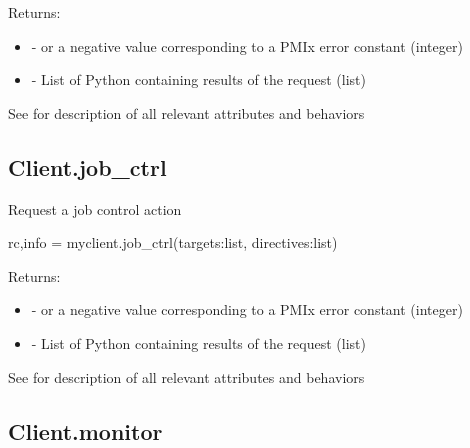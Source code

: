 Returns:

\begin{itemize}
    \item {} -  or a negative value corresponding to a PMIx error constant (integer)
    \item {} - List of Python  containing results of the request (list)
\end{itemize}


See  for description of all relevant attributes and behaviors


\subsection{Client.job_ctrl}

\summary

Request a job control action

\format

\pyspecificstart
\begin{codepar}
rc,info = myclient.job_ctrl(targets:list, directives:list)
\end{codepar}
\pyspecificend

\begin{arglist}
\end{arglist}

Returns:

\begin{itemize}
    \item {} -  or a negative value corresponding to a PMIx error constant (integer)
    \item {} - List of Python  containing results of the request (list)
\end{itemize}


See  for description of all relevant attributes and behaviors


\subsection{Client.monitor}

